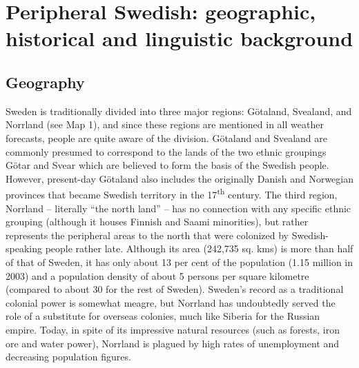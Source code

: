 
\chapter{Peripheral Swedish: geographic, historical and linguistic background}
\section{ Geography}

Sweden is traditionally divided into three major regions: Götaland, Svealand, and Norrland (see Map 1), and since these regions are mentioned in all weather forecasts, people are quite aware of the division. Götaland and Svealand are commonly presumed to correspond to the lands of the two ethnic groupings Götar and Svear which are believed to form the basis of the Swedish people.  However, present-day Götaland also includes the originally Danish and Norwegian provinces that became Swedish territory in the 17\textsuperscript{th} century. The third region, Norrland – literally “the north land” – has no connection with any specific ethnic grouping (although it houses Finnish and Saami minorities), but rather represents the peripheral areas to the north that were colonized by Swedish-speaking people rather late. Although its area (242,735 sq. kms) is more than half of that of Sweden, it has only about 13 per cent of the population (1.15 million in 2003) and a population density of about 5 persons per square kilometre (compared to about 30 for the rest of Sweden). Sweden’s record as a traditional colonial power is somewhat meagre, but Norrland has undoubtedly served the role of a substitute for overseas colonies, much like Siberia for the Russian empire. Today, in spite of its impressive natural resources (such as forests, iron ore and water power), Norrland is plagued by high rates of unemployment and decreasing population figures. 


